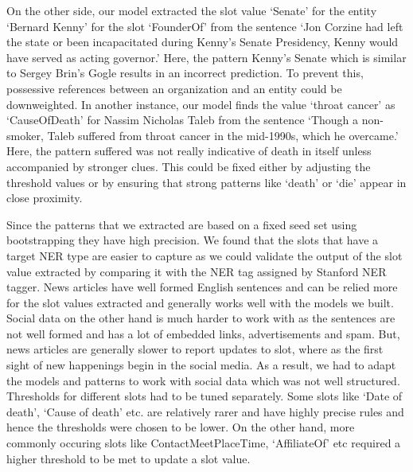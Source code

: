 On the other side, our model extracted the slot value ‘Senate’ for the entity ‘Bernard Kenny’ for the slot ‘FounderOf’ from the sentence ‘Jon Corzine had left the state or been incapacitated during Kenny's Senate Presidency, Kenny would have served as acting governor.’ Here, the pattern Kenny’s Senate which is similar to Sergey Brin’s Gogle results in an incorrect prediction. To prevent this, possessive references between an organization and an entity could be downweighted.  In another instance, our model finds the value ‘throat cancer’ as ‘CauseOfDeath’ for Nassim Nicholas Taleb from the sentence ‘Though a non-smoker, Taleb suffered from throat cancer in the mid-1990s, which he overcame.’ Here, the pattern suffered was not really indicative of death in itself unless accompanied by stronger clues. This could be fixed either by adjusting the threshold values or by ensuring that strong patterns like ‘death’ or ‘die’ appear in close proximity.

	Since the patterns that we extracted are based on a fixed seed set using bootstrapping they have high precision.  We found that the slots that have a target NER type are easier to capture as we could validate the output of the slot value extracted by comparing it with the NER tag assigned by Stanford NER tagger.
	News articles have well formed English sentences and can be relied more for the slot values extracted and generally works well with the models we built. Social data on the other hand is much harder to work with as the sentences are not well formed and has a lot of embedded links, advertisements and spam. But, news articles are generally slower to report updates to slot, where as the first sight of new happenings begin in the social media. As a result, we had to adapt the models and patterns to work with social data which was not well structured. 
Thresholds for different slots had to be tuned separately. Some slots like ‘Date of death’, ‘Cause of death’ etc. are relatively rarer and have highly precise rules and hence the thresholds were chosen to be lower. On the other hand, more commonly occuring slots like ContactMeetPlaceTime, ‘AffiliateOf’ etc required a higher threshold to be met to update a slot value.
